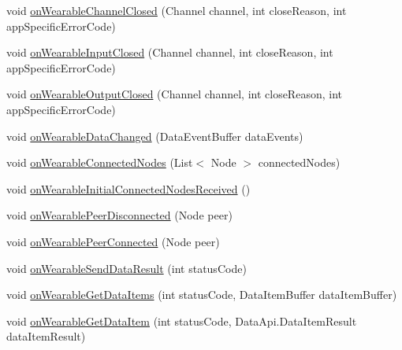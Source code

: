 \begin{DoxyCompactItemize}
\item 
void \hyperlink{interfacecom_1_1google_1_1devrel_1_1wcl_1_1callbacks_1_1WearConsumer_a90f1b1cb54bdb294e6a3340ee639e65d}{on\+Wearable\+Channel\+Closed} (Channel channel, int close\+Reason, int app\+Specific\+Error\+Code)
\item 
void \hyperlink{interfacecom_1_1google_1_1devrel_1_1wcl_1_1callbacks_1_1WearConsumer_a210448ac702228356989bddbe455db83}{on\+Wearable\+Input\+Closed} (Channel channel, int close\+Reason, int app\+Specific\+Error\+Code)
\item 
void \hyperlink{interfacecom_1_1google_1_1devrel_1_1wcl_1_1callbacks_1_1WearConsumer_a5dde314a04956ef35c4d079f426bf6db}{on\+Wearable\+Output\+Closed} (Channel channel, int close\+Reason, int app\+Specific\+Error\+Code)
\item 
void \hyperlink{interfacecom_1_1google_1_1devrel_1_1wcl_1_1callbacks_1_1WearConsumer_ad07572b94c1490e1887108b2d25699cd}{on\+Wearable\+Data\+Changed} (Data\+Event\+Buffer data\+Events)
\item 
void \hyperlink{interfacecom_1_1google_1_1devrel_1_1wcl_1_1callbacks_1_1WearConsumer_a498f9d975109c588404b9c8855634aff}{on\+Wearable\+Connected\+Nodes} (List$<$ Node $>$ connected\+Nodes)
\item 
void \hyperlink{interfacecom_1_1google_1_1devrel_1_1wcl_1_1callbacks_1_1WearConsumer_a90049f8a5821e154dfc0f17dd279e0ef}{on\+Wearable\+Initial\+Connected\+Nodes\+Received} ()
\item 
void \hyperlink{interfacecom_1_1google_1_1devrel_1_1wcl_1_1callbacks_1_1WearConsumer_a52da85e8d5431169bc17b31d241c55ed}{on\+Wearable\+Peer\+Disconnected} (Node peer)
\item 
void \hyperlink{interfacecom_1_1google_1_1devrel_1_1wcl_1_1callbacks_1_1WearConsumer_a2607a0a046ea996f4505e12e8f1c8ef1}{on\+Wearable\+Peer\+Connected} (Node peer)
\item 
void \hyperlink{interfacecom_1_1google_1_1devrel_1_1wcl_1_1callbacks_1_1WearConsumer_a39149dc277ecb6ed75e3a5214a61f97a}{on\+Wearable\+Send\+Data\+Result} (int status\+Code)
\item 
void \hyperlink{interfacecom_1_1google_1_1devrel_1_1wcl_1_1callbacks_1_1WearConsumer_ae60f2b14534d4ff65b553ef98c3a4c2b}{on\+Wearable\+Get\+Data\+Items} (int status\+Code, Data\+Item\+Buffer data\+Item\+Buffer)
\item 
void \hyperlink{interfacecom_1_1google_1_1devrel_1_1wcl_1_1callbacks_1_1WearConsumer_af3fc892221b8bc9cde08377850f111a5}{on\+Wearable\+Get\+Data\+Item} (int status\+Code, Data\+Api.\+Data\+Item\+Result data\+Item\+Result)

\end{DoxyCompactItemize}

